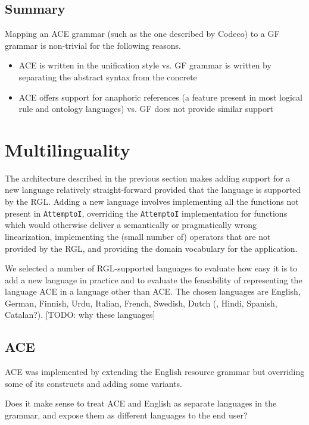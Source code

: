 \documentclass[a4paper]{article}
\begin{document}
\subsection{Summary}

Mapping an ACE grammar (such as the one described by Codeco) to a GF grammar
is non-trivial for the following reasons.

\begin{itemize}
\item ACE is written in the unification style vs. GF grammar is written
by separating the abstract syntax from the concrete
\item ACE offers support for anaphoric references (a feature present in most
logical rule and ontology languages) vs. GF does not provide similar support
\end{itemize}

\section{Multilinguality}
\label{section:Multilinguality}

The architecture described in the previous section makes adding support
for a new language relatively straight-forward provided that the language
is supported by the RGL. Adding a new language involves
implementing all the functions not present in \texttt{AttemptoI},
overriding the \texttt{AttemptoI} implementation for functions which would
otherwise deliver a semantically or pragmatically wrong linearization,
implementing the (small number of) operators that are not provided by the RGL,
and providing the domain vocabulary for the application.

We selected a number of RGL-supported languages to evaluate how easy it
is to add a new language in practice and to evaluate the feasability of
representing the language ACE in a language other than ACE. The chosen
languages are
English, German, Finnish, Urdu, Italian, French, Swedish, Dutch
(, Hindi, Spanish, Catalan?). [TODO: why these languages]

\subsection{ACE}

ACE was implemented by extending the English resource grammar but
overriding some of its constructs and adding some variants.

Does it make sense to treat ACE and English as separate languages in the
grammar, and expose them as different languages to the end user?
\end{document}
